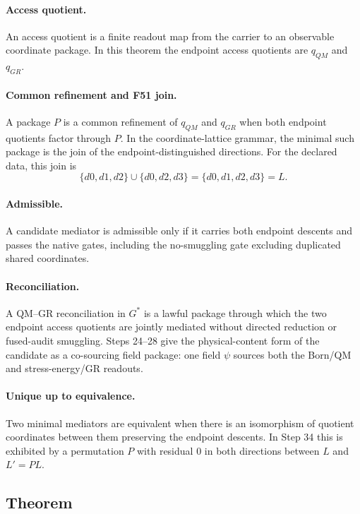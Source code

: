 \paragraph{Access quotient.}
An access quotient is a finite readout map from the carrier to an observable
coordinate package.  In this theorem the endpoint access quotients are
\(q_{QM}\) and \(q_{GR}\).

\paragraph{Common refinement and F51 join.}
A package \(P\) is a common refinement of \(q_{QM}\) and \(q_{GR}\) when both
endpoint quotients factor through \(P\).  In the coordinate-lattice grammar,
the minimal such package is the join of the endpoint-distinguished directions.
For the declared data, this join is
\[
  \{d0,d1,d2\}\cup\{d0,d2,d3\}
  =
  \{d0,d1,d2,d3\}=L.
\]

\paragraph{Admissible.}
A candidate mediator is admissible only if it carries both endpoint descents
and passes the native gates, including the no-smuggling gate excluding
duplicated shared coordinates.

\paragraph{Reconciliation.}
A QM--GR reconciliation in \(G^\ast\) is a lawful package through which the
two endpoint access quotients are jointly mediated without directed reduction
or fused-audit smuggling.  Steps 24--28 give the physical-content form of the
candidate as a co-sourcing field package: one field \(\psi\) sources both the
Born/QM and stress-energy/GR readouts.

\paragraph{Unique up to equivalence.}
Two minimal mediators are equivalent when there is an isomorphism of quotient
coordinates between them preserving the endpoint descents.  In Step 34 this is
exhibited by a permutation \(P\) with residual \(0\) in both directions
between \(L\) and \(L'=PL\).

\subsection*{Theorem}

